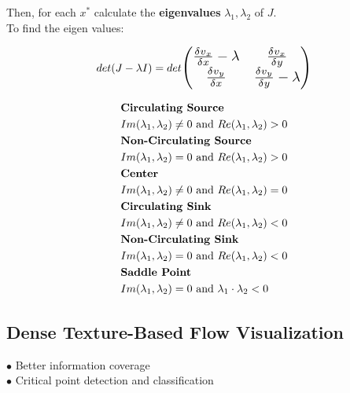 Then, for each $x^*$ calculate the \textbf{eigenvalues} $\lambda_1, \lambda_2$ of $J$. \\
To find the eigen values:

$$det(J - \lambda I) = det\Scale[1.3]{\begin{pmatrix}
            \frac{\delta v_x}{\delta x} - \lambda & \frac{\delta v_x}{\delta y}           \\
            \frac{\delta v_y}{\delta x}           & \frac{\delta v_y}{\delta y} - \lambda \\
        \end{pmatrix}}$$

\begin{align*}
     & \text{\textbf{Circulating Source}}                                        \\
     & Im(\lambda_1, \lambda_2) \neq 0 \text{ and } Re(\lambda_1, \lambda_2) > 0 \\
     & \text{\textbf{Non-Circulating Source}}                                    \\
     & Im(\lambda_1, \lambda_2) = 0 \text{ and } Re(\lambda_1, \lambda_2) > 0    \\
     & \text{\textbf{Center}}                                                    \\
     & Im(\lambda_1, \lambda_2) \neq 0 \text{ and } Re(\lambda_1, \lambda_2) = 0 \\
     & \text{\textbf{Circulating Sink}}                                          \\
     & Im(\lambda_1, \lambda_2) \neq 0 \text{ and } Re(\lambda_1, \lambda_2) < 0 \\
     & \text{\textbf{Non-Circulating Sink}}                                      \\
     & Im(\lambda_1, \lambda_2) = 0 \text{ and } Re(\lambda_1, \lambda_2) < 0    \\
     & \text{\textbf{Saddle Point}}                                              \\
     & Im(\lambda_1, \lambda_2) = 0 \text{ and } \lambda_1 \cdot \lambda_2 < 0   \\
\end{align*}

\subsection{Dense Texture-Based Flow Visualization}
$\bullet$ Better information coverage \\
$\bullet$ Critical point detection and classification \\

